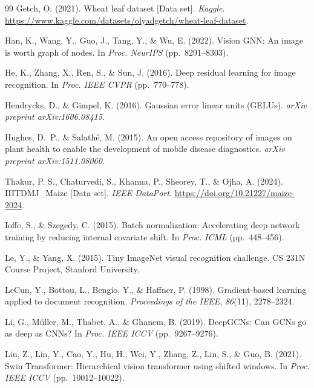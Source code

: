 \documentclass[]{interact}
\theoremstyle{plain}
\theoremstyle{definition}
\theoremstyle{remark}
\begin{document}
\begin{thebibliography}{99}
Getch, O. (2021). Wheat leaf dataset [Data set]. \emph{Kaggle}. \url{https://www.kaggle.com/datasets/olyadgetch/wheat-leaf-dataset}.

Han, K., Wang, Y., Guo, J., Tang, Y., \& Wu, E. (2022). Vision GNN: An image is worth graph of nodes. In \emph{Proc. NeurIPS} (pp.~8291--8303).

He, K., Zhang, X., Ren, S., \& Sun, J. (2016). Deep residual learning for image recognition. In \emph{Proc. IEEE CVPR} (pp.~770--778).

Hendrycks, D., \& Gimpel, K. (2016). Gaussian error linear units (GELUs). \emph{arXiv preprint arXiv:1606.08415}.

Hughes, D.~P., \& Salath\'{e}, M. (2015). An open access repository of images on plant health to enable the development of mobile disease diagnostics. \emph{arXiv preprint arXiv:1511.08060}.

Thakur, P. S., Chaturvedi, S., Khanna, P., Sheorey, T., \& Ojha, A. (2024). IIITDMJ\_Maize [Data set]. \emph{IEEE DataPort}. \url{https://doi.org/10.21227/maize-2024}.

Ioffe, S., \& Szegedy, C. (2015). Batch normalization: Accelerating deep network training by reducing internal covariate shift. In \emph{Proc. ICML} (pp.~448--456).

Le, Y., \& Yang, X. (2015). Tiny ImageNet visual recognition challenge. CS 231N Course Project, Stanford University.

LeCun, Y., Bottou, L., Bengio, Y., \& Haffner, P. (1998). Gradient-based learning applied to document recognition. \emph{Proceedings of the IEEE}, \emph{86}(11), 2278--2324.

Li, G., M\"{u}ller, M., Thabet, A., \& Ghanem, B. (2019). DeepGCNs: Can GCNs go as deep as CNNs? In \emph{Proc. IEEE ICCV} (pp.~9267--9276).

Liu, Z., Lin, Y., Cao, Y., Hu, H., Wei, Y., Zhang, Z., Lin, S., \& Guo, B. (2021). Swin Transformer: Hierarchical vision transformer using shifted windows. In \emph{Proc. IEEE ICCV} (pp.~10012--10022).


\end{thebibliography}
\end{document}

